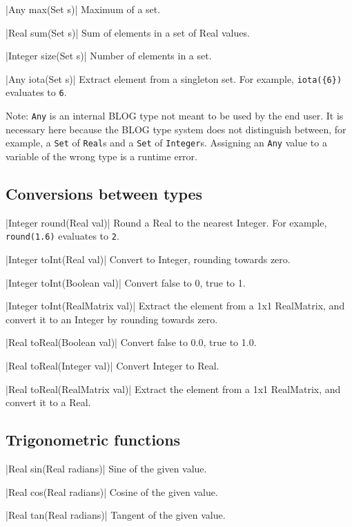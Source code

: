 \blog|Any max(Set s)|
\myindent Maximum of a set.

\blog|Real sum(Set s)|
\myindent Sum of elements in a set of Real values.

\blog|Integer size(Set s)|
\myindent Number of elements in a set.

\blog|Any iota(Set s)|
\myindent Extract element from a singleton set.
For example, \verb|iota({6})| evaluates to \verb|6|.

Note: \verb|Any| is an internal BLOG type not meant to be used by the end user.
It is necessary here because the BLOG type system does not distinguish between,
for example, a \verb|Set| of \verb|Real|s and a \verb|Set| of \verb|Integer|s.
Assigning an \verb|Any| value to a variable of the wrong type is a runtime
error.


\subsection{Conversions between types}
\label{sec:builtin-conversions}

\blog|Integer round(Real val)|
\myindent Round a Real to the nearest Integer.
For example, \verb|round(1.6)| evaluates to \verb|2|.

\blog|Integer toInt(Real val)|
\myindent Convert to Integer, rounding towards zero.

\blog|Integer toInt(Boolean val)|
\myindent Convert false to 0, true to 1.

\blog|Integer toInt(RealMatrix val)|
\myindent Extract the element from a 1x1 RealMatrix, and convert it to an
Integer by rounding towards zero.

\blog|Real toReal(Boolean val)|
\myindent Convert false to 0.0, true to 1.0.

\blog|Real toReal(Integer val)|
\myindent Convert Integer to Real.

\blog|Real toReal(RealMatrix val)|
\myindent Extract the element from a 1x1 RealMatrix, and convert it to a Real.


\subsection{Trigonometric functions}
\label{sec:builtin-trig}

\blog|Real sin(Real radians)|
\myindent Sine of the given value.

\blog|Real cos(Real radians)|
\myindent Cosine of the given value.

\blog|Real tan(Real radians)|
\myindent Tangent of the given value.

